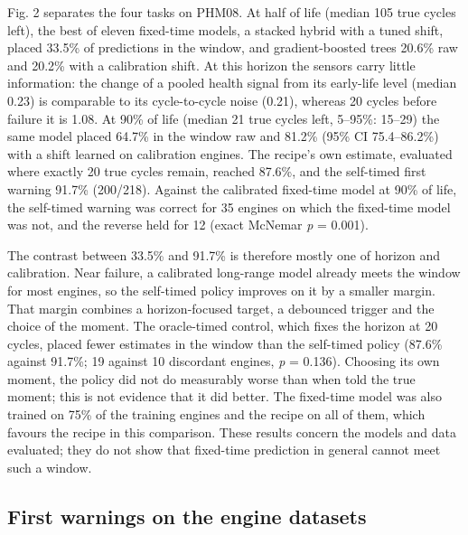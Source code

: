 \documentclass[a4paper,fleqn,doubleblind]{cas-dc}
\begin{document}
Fig. 2 separates the four tasks on PHM08. At half of life (median 105 true cycles left), the best of eleven fixed-time models, a stacked hybrid with a tuned shift, placed 33.5\% of predictions in the window, and gradient-boosted trees 20.6\% raw and 20.2\% with a calibration shift. At this horizon the sensors carry little information: the change of a pooled health signal from its early-life level (median 0.23) is comparable to its cycle-to-cycle noise (0.21), whereas 20 cycles before failure it is 1.08. At 90\% of life (median 21 true cycles left, 5--95\%: 15--29) the same model placed 64.7\% in the window raw and 81.2\% (95\% CI 75.4--86.2\%) with a shift learned on calibration engines. The recipe's own estimate, evaluated where exactly 20 true cycles remain, reached 87.6\%, and the self-timed first warning 91.7\% (200/218). Against the calibrated fixed-time model at 90\% of life, the self-timed warning was correct for 35 engines on which the fixed-time model was not, and the reverse held for 12 (exact McNemar \textit{p} = 0.001).

The contrast between 33.5\% and 91.7\% is therefore mostly one of horizon and calibration. Near failure, a calibrated long-range model already meets the window for most engines, so the self-timed policy improves on it by a smaller margin. That margin combines a horizon-focused target, a debounced trigger and the choice of the moment. The oracle-timed control, which fixes the horizon at 20 cycles, placed fewer estimates in the window than the self-timed policy (87.6\% against 91.7\%; 19 against 10 discordant engines, \textit{p} = 0.136). Choosing its own moment, the policy did not do measurably worse than when told the true moment; this is not evidence that it did better. The fixed-time model was also trained on 75\% of the training engines and the recipe on all of them, which favours the recipe in this comparison. These results concern the models and data evaluated; they do not show that fixed-time prediction in general cannot meet such a window.

\subsection{First warnings on the engine datasets}
\end{document}
